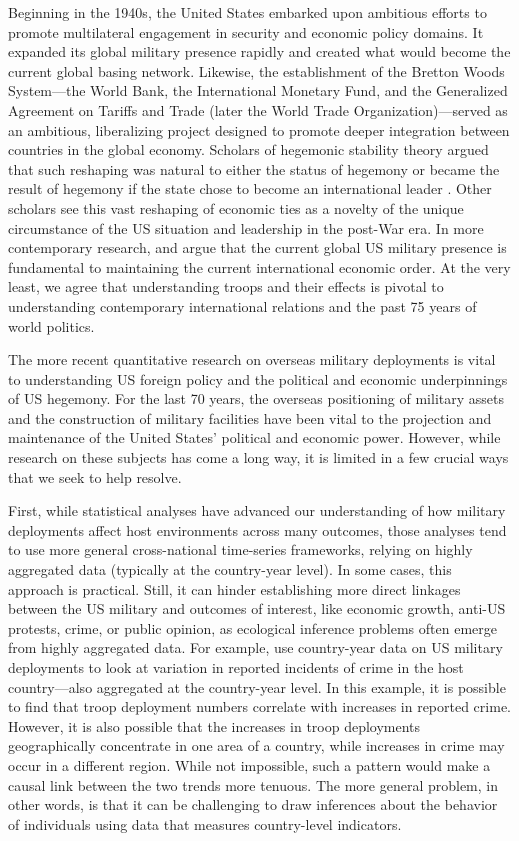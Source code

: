 Beginning in the 1940s, the United States embarked upon ambitious efforts to promote multilateral engagement in security and economic policy domains. It expanded its global military presence rapidly and created what would become the current global basing network. Likewise, the establishment of the Bretton Woods System---the World Bank, the International Monetary Fund, and the Generalized Agreement on Tariffs and Trade (later the World Trade Organization)---served as an ambitious, liberalizing project designed to promote deeper integration between countries in the global economy. Scholars of hegemonic stability theory argued that such reshaping was natural to either the status of hegemony or became the result of hegemony if the state chose to become an international leader \cite{kindleberger1973,krasner1976}.  Other scholars see this vast reshaping of economic ties as a novelty of the unique circumstance of the US situation and leadership in the post-War era. In more contemporary research,  and  argue that the current global US military presence is fundamental to maintaining the current international economic order. At the very least, we agree that understanding troops and their effects is pivotal to understanding contemporary international relations and the past 75 years of world politics. 

The more recent quantitative research on overseas military deployments is vital to understanding US foreign policy and the political and economic underpinnings of US hegemony. For the last 70 years, the overseas positioning of military assets and the construction of military facilities have been vital to the projection and maintenance of the United States' political and economic power. However, while research on these subjects has come a long way, it is limited in a few crucial ways that we seek to help resolve. 

First, while statistical analyses have advanced our understanding of how military deployments affect host environments across many outcomes, those analyses tend to use more general cross-national time-series frameworks, relying on highly aggregated data (typically at the country-year level). In some cases, this approach is practical. Still, it can hinder establishing more direct linkages between the US military and outcomes of interest, like economic growth, anti-US protests, crime, or public opinion, as ecological inference problems often emerge from highly aggregated data. For example,  use country-year data on US military deployments to look at variation in reported incidents of crime in the host country---also aggregated at the country-year level. In this example, it is possible to find that troop deployment numbers correlate with increases in reported crime. However, it is also possible that the increases in troop deployments geographically concentrate in one area of a country, while increases in crime may occur in a different region. While not impossible, such a pattern would make a causal link between the two trends more tenuous. The more general problem, in other words, is that it can be challenging to draw inferences about the behavior of individuals using data that measures country-level indicators. 

